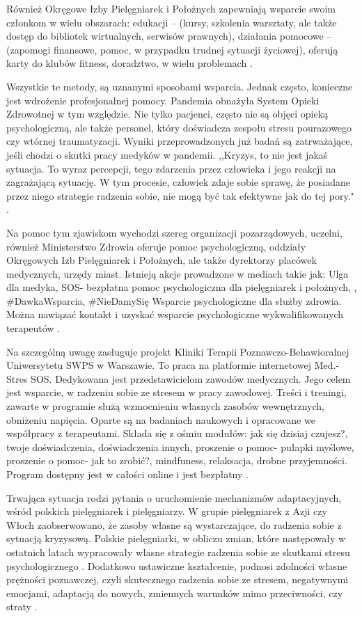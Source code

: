 \documentclass[a4paper,12pt,twoside,openany]{report}
\begin{document}
Również Okręgowe Izby Pielęgniarek i Położnych zapewniają wsparcie swoim członkom w wielu obszarach: edukacji – (kursy, szkolenia warsztaty, ale także dostęp do bibliotek wirtualnych, serwisów prawnych), działania pomocowe – (zapomogi finansowe, pomoc, w przypadku trudnej sytuacji życiowej), oferują karty do klubów fitness, doradztwo, w wielu problemach \cite{izby}.

Wszystkie te metody, są uznanymi sposobami wsparcia. Jednak często, konieczne jest wdrożenie profesjonalnej pomocy. Pandemia obnażyła System Opieki Zdrowotnej w tym względzie. Nie tylko pacjenci, często nie są objęci opieką psychologiczną, ale także personel, który doświadcza zespołu stresu pourazowego czy wtórnej traumatyzacji.  Wyniki przeprowadzonych już badań są zatrważające, jeśli chodzi o skutki pracy medyków w pandemii. ,,Kryzys, to nie jest jakaś sytuacja. To wyraz percepcji, tego zdarzenia przez człowieka i jego reakcji na zagrażającą sytuację. W tym procesie, człowiek zdaje sobie sprawę, że posiadane przez niego strategie radzenia sobie, nie mogą być tak efektywne jak do tej pory." \cite{covid}.

Na pomoc tym zjawiskom wychodzi szereg organizacji pozarządowych, uczelni, również Ministerstwo Zdrowia oferuje pomoc psychologiczną, oddziały Okręgowych Izb Pielęgniarek i Położnych, ale także dyrektorzy placówek medycznych, urzędy miast. Istnieją akcje prowadzone w mediach takie jak: Ulga dla medyka, SOS- bezpłatna pomoc psychologiczna dla pielęgniarek i położnych, , \#DawkaWsparcia, \#NieDamySię Wsparcie psychologiczne dla służby zdrowia. Można nawiązać kontakt i uzyskać wsparcie psychologiczne wykwalifikowanych terapeutów \cite{jak}.

Na szczególną uwagę zasługuje projekt Kliniki Terapii Poznawczo-Behawioralnej Uniwersytetu SWPS w Warszawie. To praca na platformie internetowej Med.-Stres SOS. Dedykowana jest przedstawicielom zawodów medycznych. Jego celem jest wsparcie, w radzeniu sobie ze stresem w pracy zawodowej. Treści i treningi, zawarte w programie służą wzmocnieniu własnych zasobów wewnętrznych, obniżeniu napięcia. Oparte są na badaniach naukowych i opracowane we współpracy z terapeutami. Składa się z ośmiu modułów: jak się dzisiaj czujesz?, twoje doświadczenia, doświadczenia innych, proszenie o pomoc- pułapki myślowe, proszenie o pomoc- jak to zrobić?, mindfuness, relaksacja, drobne przyjemności. Program dostępny jest w całości online i jest bezpłatny \cite {projekt}.

Trwająca sytuacja rodzi pytania o uruchomienie mechanizmów adaptacyjnych, wśród polskich pielęgniarek i pielęgniarzy. W grupie pielęgniarek z Azji czy Włoch zaobserwowano, że zasoby własne są wystarczające, do radzenia sobie z sytuacją kryzysową. Polskie pielęgniarki, w obliczu zmian, które następowały w ostatnich latach wypracowały własne strategie radzenia sobie ze skutkami stresu psychologicznego \cite{covid}. Dodatkowo ustawiczne kształcenie, podnosi zdolności własne prężności poznawczej, czyli skutecznego radzenia sobie ze stresem, negatywnymi emocjami, adaptacją do nowych, zmiennych warunków mimo przeciwności, czy straty \cite{prężność}. 
 
\end{document}
